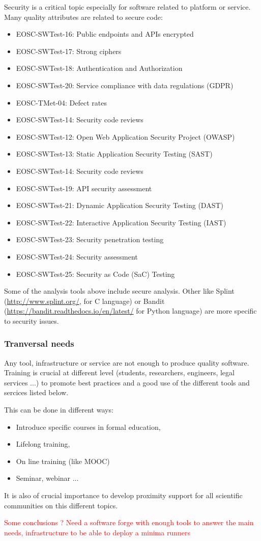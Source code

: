 Security is a critical topic especially for software related to
platform or service. Many quality attributes are related to secure code:

\begin{itemize}
  \item EOSC-SWTest-16: Public endpoints and APIs encrypted
  \item EOSC-SWTest-17: Strong ciphers
  \item EOSC-SWTest-18: Authentication and Authorization
  \item EOSC-SWTest-20: Service compliance with data regulations (GDPR)
  \item EOSC-TMet-04: Defect rates
  \item EOSC-SWTest-14: Security code reviews
  \item EOSC-SWTest-12: Open Web Application Security Project (OWASP)
  \item EOSC-SWTest-13: Static Application Security Testing (SAST)
  \item EOSC-SWTest-14: Security code reviews
  \item EOSC-SWTest-19: API security assessment
  \item EOSC-SWTest-21: Dynamic Application Security Testing (DAST)
  \item EOSC-SWTest-22: Interactive Application Security Testing (IAST)
  \item EOSC-SWTest-23: Security penetration testing
  \item EOSC-SWTest-24: Security assessment
  \item EOSC-SWTest-25: Security as Code (SaC) Testing
\end{itemize}

Some of the analysis tools above include secure analysis. Other like
Splint (\url{http://www.splint.org/}, for C language) or 
Bandit (\url{https://bandit.readthedocs.io/en/latest/} for Python
language) are more specific to security issues.

\subsubsection{Tranversal needs}

Any tool, infrastructure or service are not enough to produce quality
software. Training is crucial at different level (students,
researchers, engineers, legal services ...) to promote best practices
and a good use of the different tools and sercices listed below.

This can be done in different ways:
\begin{itemize}
\item Introduce specific courses in formal education,
\item Lifelong training,
\item On line training (like MOOC)
\item Seminar, webinar ...
\end{itemize}

It is also of crucial importance to develop proximity support for all
scientific communities on this different topics.


\textcolor{red}{Some conclusions ? Need a software forge with enough
  tools to answer the main needs, infrastructure to be able to deploy
  a minima runners}
